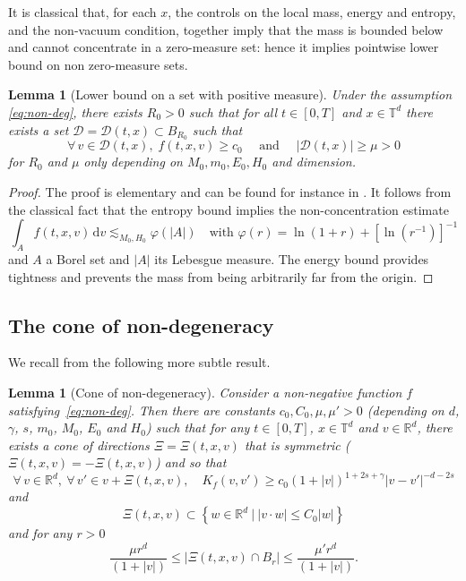 \documentclass[JEP,XML,SOM,Unicode,NoFloatCountersInSection]{cedram}
\theoremstyle{plain}
\newtheorem{lemma}[thm]{Lemma}
\theoremstyle{definition}
\numberwithin{equation}{section}
\newcommand{\R}{\mathbb R}
\newcommand{\dd} {\, \mathrm{d}}
\newcommand{\angulars}{{2s}}
\begin{document}
It is classical that, for each $x$, the controls on the local mass,
energy and entropy, and the non-vacuum condition, together imply that
the mass is bounded below and cannot concentrate in a zero-measure
set: hence it implies pointwise lower bound on non zero-measure sets.

\begin{lemma}[Lower bound on a set with positive
measure] \label{lem:D} Under the assumption \eqref{eq:non-deg},
there exists $R_0>0$ such that for all $t \in [0,T]$ and
$x \in \mathbb{T}^d$ there exists a set
$\mathcal{D} = \mathcal{D}(t,x) \subset B_{R_0}$ such that
\[ \forall \, v \in \mathcal{D}(t,x), \; f(t,x,v) \ge c_0 \quad \text{ and } \quad
|\mathcal{D}(t,x)| \ge \mu >0 \]
for $R_0$ and $\mu$ only depending on $M_0,m_0,E_0,H_0$ and
dimension.
\end{lemma}

\begin{proof}
The proof is elementary and can be found for instance in
\cite[Lem.\,4.6]{luis}. It follows from the classical fact that the
entropy bound implies the non-concentration estimate
\[
\int_A f(t,x,v) \dd v \lesssim_{M_0,H_0} \varphi(|A|) \quad \mbox{
with } \varphi(r) = \ln(1+r) + \left[ \ln\left(r^{-1}\right) \right]^{-1}
\]
and $A$ a Borel set and $|A|$ its Lebesgue measure. The energy bound
provides tightness and prevents the mass from being arbitrarily far
from the origin.
\end{proof}

\subsection{The cone of non-degeneracy}

We recall from \cite{luis,is} the following more subtle result.

\begin{lemma}[Cone of non-degeneracy]\label{lem:cone-nd}
Consider a non-negative function $f$
satisfying~\eqref{eq:non-deg}. Then there are constants
$c_0,C_0,\mu, \mu'>0$ (depending on $d$, $\gamma$, $s$, $m_0$,
$M_0$, $E_0$ and $H_0$) such that for any $t \in [0,T]$,
$x \in \mathbb T^d$ and $v \in \R^d$, there exists a cone of
directions $\Xi = \Xi(t,x,v)$ that is symmetric
(\ie $\Xi(t,x,v) = -\Xi(t,x,v)$) and so that
\[
\forall \, v \in \R^d, \ \forall \, v' \in v+\Xi(t,x,v), \quad K_f(v,v') \geq c_0 (1+|v|)^{1+\angulars+\gamma}
|v-v'|^{-d-\angulars}
\]
and
\[
\Xi(t,x,v) \subset \left\{ w \in \R^d \ | \ |v \cdot w| \le C_0
|w|\right\}
\]
and for any $r >0$
\begin{equation}\label{eq:cone-estim}
\frac{\mu r^d}{(1+|v|)} \le \left|\Xi(t,x,v) \cap B_r\right| \le
\frac{\mu' r^d}{(1+|v|)}.
\end{equation}
\end{lemma}
\end{document}

